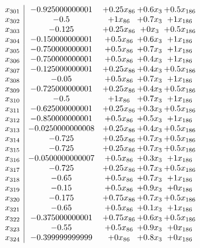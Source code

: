 \documentclass[11pt]{article}
\begin{document}
\[\begin{array}{c| c c@{\hskip 2pt} c@{\hskip 2pt} c@{\hskip 2pt} }
 x_{301}   &  -0.925000000001 & + 0.25 x_{86} & + 0.6 x_{3} & + 0.5 x_{186}\\
 x_{302}   &  -0.5 & + 1 x_{86} & + 0.7 x_{3} & + 1 x_{186}\\
 x_{303}   &  -0.125 & + 0.25 x_{86} & + 0 x_{3} & + 0.5 x_{186}\\
 x_{304}   &  -0.150000000001 & + 0.5 x_{86} & + 0.6 x_{3} & + 1 x_{186}\\
 x_{305}   &  -0.750000000001 & + 0.5 x_{86} & + 0.7 x_{3} & + 1 x_{186}\\
 x_{306}   &  -0.750000000001 & + 0.5 x_{86} & + 0.4 x_{3} & + 1 x_{186}\\
 x_{307}   &  -0.125000000001 & + 0.25 x_{86} & + 0.4 x_{3} & + 0.5 x_{186}\\
 x_{308}   &  -0.05 & + 0.5 x_{86} & + 0.7 x_{3} & + 1 x_{186}\\
 x_{309}   &  -0.725000000001 & + 0.25 x_{86} & + 0.4 x_{3} & + 0.5 x_{186}\\
 x_{310}   &  -0.5 & + 1 x_{86} & + 0.7 x_{3} & + 1 x_{186}\\
 x_{311}   &  -0.625000000001 & + 0.25 x_{86} & + 0.3 x_{3} & + 0.5 x_{186}\\
 x_{312}   &  -0.850000000001 & + 0.5 x_{86} & + 0.5 x_{3} & + 1 x_{186}\\
 x_{313}   &  -0.0250000000008 & + 0.25 x_{86} & + 0.4 x_{3} & + 0.5 x_{186}\\
 x_{314}   &  -0.725 & + 0.25 x_{86} & + 0.7 x_{3} & + 0.5 x_{186}\\
 x_{315}   &  -0.725 & + 0.25 x_{86} & + 0.7 x_{3} & + 0.5 x_{186}\\
 x_{316}   &  -0.0500000000007 & + 0.5 x_{86} & + 0.3 x_{3} & + 1 x_{186}\\
 x_{317}   &  -0.725 & + 0.25 x_{86} & + 0.7 x_{3} & + 0.5 x_{186}\\
 x_{318}   &  -0.65 & + 0.5 x_{86} & + 0.7 x_{3} & + 1 x_{186}\\
 x_{319}   &  -0.15 & + 0.5 x_{86} & + 0.9 x_{3} & + 0 x_{186}\\
 x_{320}   &  -0.175 & + 0.75 x_{86} & + 0.7 x_{3} & + 0.5 x_{186}\\
 x_{321}   &  -0.65 & + 0.5 x_{86} & + 0.1 x_{3} & + 1 x_{186}\\
 x_{322}   &  -0.375000000001 & + 0.75 x_{86} & + 0.6 x_{3} & + 0.5 x_{186}\\
 x_{323}   &  -0.55 & + 0.5 x_{86} & + 0.9 x_{3} & + 0 x_{186}\\
 x_{324}   &  -0.399999999999 & + 0 x_{86} & + 0.8 x_{3} & + 0 x_{186}\\

\end{array}\]
\end{document}
